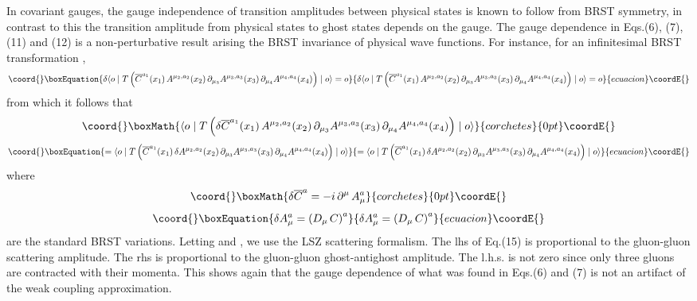 \documentclass[a4paper,12pt]{article}
\begin{document}
In covariant gauges, the gauge independence of transition amplitudes between physical states is known to follow from BRST symmetry, in contrast to this the transition amplitude from physical states to ghost states depends on the gauge.  The gauge dependence in Eqs.(6), (7), (11) and (12) is a non-perturbative result arising the BRST invariance of physical wave functions.  For instance, for an infinitesimal BRST transformation \myHighlight{$\delta$}\coordHE{},
\begin{equation}\coord{}\boxEquation{
\delta \langle o \mid T \left(\overline{C}^{a_{1}}(x_{1}) \, A^{\mu_{2},a_{2}}(x_{2}) \, \partial_{\mu_{3}}A^{\mu_{3},a_{3}}(x_{3}) \, \partial_{\mu_{4}}A^{\mu_{4},a_{4}}(x_{4}) \right) \mid o \rangle=o
}{
\delta \langle o \mid T \left(\overline{C}^{a_{1}}(x_{1}) \, A^{\mu_{2},a_{2}}(x_{2}) \, \partial_{\mu_{3}}A^{\mu_{3},a_{3}}(x_{3}) \, \partial_{\mu_{4}}A^{\mu_{4},a_{4}}(x_{4}) \right) \mid o \rangle=o
}{ecuacion}\coordE{}\end{equation}
from which it follows that
\begin{displaymath}\coord{}\boxMath{
\langle o \mid T \left( \delta \overline{C}^{a_{1}}(x_{1}) \, A^{\mu_{2},a_{2}}(x_{2}) \, \partial_{\mu_{3}}A^{\mu_{3},a_{3}}(x_{3}) \, \partial_{\mu_{4}}A^{\mu_{4},a_{4}}(x_{4}) \right) \mid o \rangle
}{corchetes}{0pt}\coordE{}\end{displaymath}
\begin{equation}\coord{}\boxEquation{
=\langle o \mid T \left(\overline{C}^{a_{1}}(x_{1}) \, \delta A^{\mu_{2},a_{2}}(x_{2}) \, \partial_{\mu_{3}}A^{\mu_{3},a_{3}}(x_{3}) \, \partial_{\mu_{4}}A^{\mu_{4},a_{4}}(x_{4})\right) \mid o \rangle
}{
=\langle o \mid T \left(\overline{C}^{a_{1}}(x_{1}) \, \delta A^{\mu_{2},a_{2}}(x_{2}) \, \partial_{\mu_{3}}A^{\mu_{3},a_{3}}(x_{3}) \, \partial_{\mu_{4}}A^{\mu_{4},a_{4}}(x_{4})\right) \mid o \rangle
}{ecuacion}\coordE{}\end{equation}
where
\begin{displaymath}\coord{}\boxMath{
\delta \overline{C}^{a} = - {i} \, \partial^{\mu} \, A^{a}_{\mu}
}{corchetes}{0pt}\coordE{}\end{displaymath}
\begin{equation}\coord{}\boxEquation{
\delta A^{a}_{\mu} = \left(D_{\mu} \, C \right)^{a}
}{
\delta A^{a}_{\mu} = \left(D_{\mu} \, C \right)^{a}
}{ecuacion}\coordE{}\end{equation}
are the standard BRST variations. Letting \coordHE{} and \coordHE{},
we use the LSZ scattering formalism.  The lhs of Eq.(15) is proportional to the gluon-gluon scattering amplitude.  The rhs is proportional to the gluon-gluon \myHighlight{$\rightarrow$}\coordHE{} ghost-antighost amplitude.  The l.h.s. is not zero since only three gluons are contracted with their momenta.  This shows again that the gauge dependence of what was found in Eqs.(6) and (7) is not an artifact of the weak coupling approximation.
\end{document}

